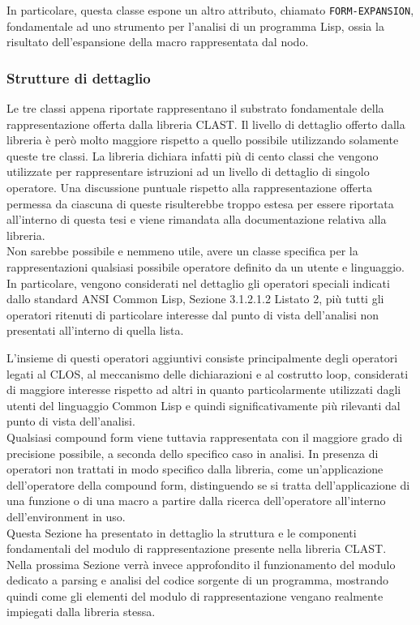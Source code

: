 In particolare, questa classe espone un altro attributo, chiamato \texttt
{FORM-EXPANSION}, fondamentale ad uno strumento per l’analisi di un programma
Lisp, ossia la risultato dell’espansione della macro rappresentata dal nodo.\\

\subsubsection{Strutture di dettaglio}

Le tre classi appena riportate rappresentano il substrato fondamentale della
rappresentazione offerta dalla libreria CLAST. Il livello di dettaglio offerto
dalla libreria è però molto maggiore rispetto a quello possibile utilizzando
solamente queste tre classi. La libreria dichiara infatti più di cento classi
che vengono utilizzate per rappresentare istruzioni ad un livello di dettaglio
di singolo operatore. Una discussione puntuale rispetto alla rappresentazione
offerta permessa da ciascuna di queste risulterebbe troppo estesa per essere
riportata all’interno di questa tesi e viene rimandata alla documentazione
relativa alla libreria.\\

Non sarebbe possibile e nemmeno utile, avere un classe specifica per la
rappresentazioni qualsiasi possibile operatore definito da un utente e
linguaggio. In particolare, vengono considerati nel dettaglio gli operatori
speciali indicati dallo standard ANSI Common Lisp, Sezione 3.1.2.1.2 Listato
2, più tutti gli operatori ritenuti di particolare interesse dal punto di
vista dell’analisi non presentati all’interno di quella lista.

L'insieme di questi operatori aggiuntivi consiste principalmente degli
operatori legati al CLOS, al meccanismo delle dichiarazioni e al costrutto
loop, considerati di maggiore interesse rispetto ad altri in quanto
particolarmente utilizzati dagli utenti del linguaggio Common Lisp e quindi
significativamente più rilevanti dal punto di vista dell’analisi.\\

Qualsiasi compound form viene tuttavia rappresentata con il maggiore grado di
precisione possibile, a seconda dello specifico caso in analisi. In presenza
di operatori non trattati in modo specifico dalla libreria, come
un'applicazione dell'operatore della compound form, distinguendo se si tratta
dell’applicazione di una funzione o di una macro a partire dalla ricerca
dell'operatore all'interno dell'environment in uso.\\

Questa Sezione ha presentato in dettaglio la struttura e le componenti
fondamentali del modulo di rappresentazione presente nella libreria CLAST.
Nella prossima Sezione verrà invece approfondito il funzionamento del modulo
dedicato a parsing e analisi del codice sorgente di un programma, mostrando
quindi come gli elementi del modulo di rappresentazione vengano realmente
impiegati dalla libreria stessa.
